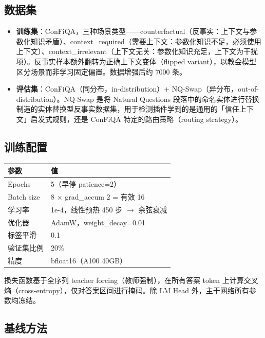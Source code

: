 \documentclass[11pt,a4paper]{ctexart}
\begin{document}
\subsection{数据集}

\begin{itemize}
    \item \textbf{训练集}：ConFiQA，三种场景类型——counterfactual（反事实：上下文与参数化知识矛盾）、context\_required（需要上下文：参数化知识不足，必须使用上下文）、context\_irrelevant（上下文无关：参数化知识充足，上下文为干扰项）。反事实样本额外翻转为正确上下文变体（flipped variant），以教会模型区分场景而非学习固定偏置。数据增强后约 7000 条。
    \item \textbf{评估集}：ConFiQA（同分布，in-distribution）+ NQ-Swap（异分布，out-of-distribution）。NQ-Swap 是将 Natural Questions 段落中的命名实体进行替换制造的实体替换型反事实数据集，用于检测插件学到的是通用的「信任上下文」启发式规则，还是 ConFiQA 特定的路由策略（routing strategy）。
\end{itemize}

\subsection{训练配置}

\begin{table}[h]
\centering
\begin{tabular}{ll}
\toprule
参数 & 值 \\
\midrule
Epochs & 5（早停 patience=2） \\
Batch size & 8 $\times$ grad\_accum 2 = 有效 16 \\
学习率 & 1e-4，线性预热 450 步 $\to$ 余弦衰减 \\
优化器 & AdamW，weight\_decay=0.01 \\
标签平滑 & 0.1 \\
验证集比例 & 20\% \\
精度 & bfloat16（A100 40GB） \\
\bottomrule
\end{tabular}
\end{table}

损失函数基于全序列 teacher forcing（教师强制），在所有答案 token 上计算交叉熵（cross-entropy），仅对答案区间进行掩码。除 LM Head 外，主干网络所有参数均冻结。

\subsection{基线方法}
\end{document}
